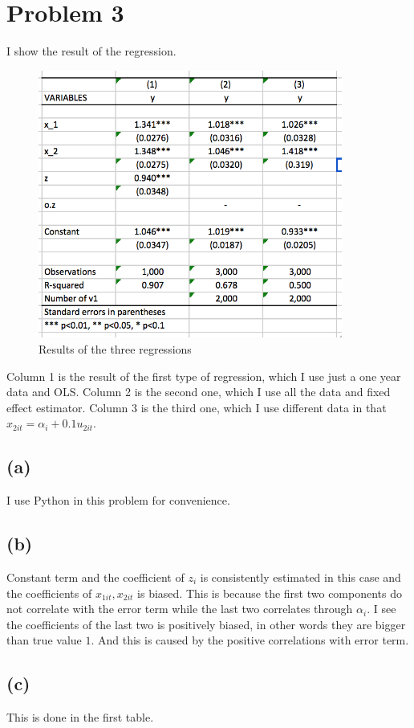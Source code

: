 \documentclass{article}
\begin{document}
\section{Problem 3}
I show the result of the regression.
\begin{figure}[h]
    \centering
    \includegraphics[width=10cm]{3.png}
    \caption{Results of the three regressions}
\end{figure}
Column 1 is the result of the first type of regression, which I use just a one year data and OLS. Column 2 is the second one, which I use all the data and fixed effect estimator. Column 3 is the third one, which I use different data in that $x_{2it} = \alpha_i + 0.1u_{2it}$.
\subsection{(a)}
I use Python in this problem for convenience.

\subsection{(b)}
Constant term and the coefficient of $z_i$ is consistently estimated in this case and the coefficients of $x_{1it}, x_{2it}$ is biased. This is because the first two components do not correlate with the error term while the last two correlates through $\alpha_i$. I see the coefficients of the last two is positively biased, in other words they are bigger than true value $1$. And this is caused by the positive correlations with error term.

\subsection{(c)}
This is done in the first table.
\end{document}
